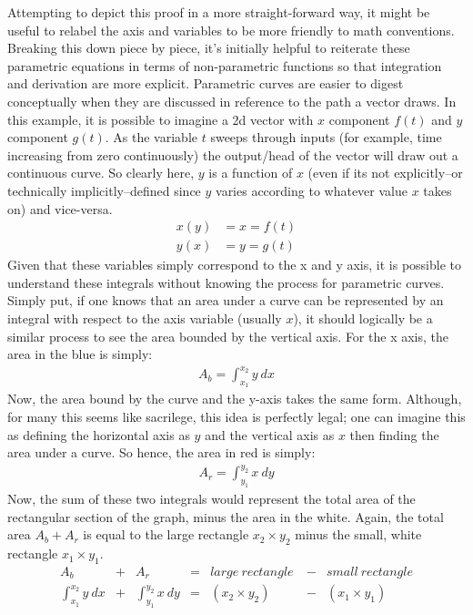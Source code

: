 \documentclass[11pt,a4paper]{article}
\begin{document}
Attempting to depict this proof in a more straight-forward way, it might be useful to relabel the axis and variables to be more friendly to math conventions. \\

Breaking this down piece by piece, it's initially helpful to reiterate these parametric equations in terms of non-parametric functions so that integration and derivation are more explicit. Parametric curves are easier to digest conceptually when they are discussed in reference to the path a vector draws. In this example, it is possible to imagine a 2d vector with $x$ component $f(t)$ and $y$ component $g(t)$.  As the variable $t$ sweeps through inputs (for example, time increasing from zero continuously) the output/head of the vector will draw out a continuous curve. So clearly here,  $y$ is a function of $x$ (even if its not explicitly--or technically implicitly--defined since $y$ varies according to whatever value $x$ takes on) and vice-versa.
\begin{align*}
x(y) &= x = f(t)\\
y(x) &= y = g(t)
\end{align*}
Given that these variables simply correspond to the x and y axis, it is possible to understand these integrals without knowing the process for parametric curves. Simply put, if one knows that an area under a curve can be represented by an integral with respect to the axis variable (usually $x$), it should logically be a similar process to see the area bounded by the vertical axis.  For the x axis, the area in the blue is simply:
\begin{align*}
A_b = \int_{x_1}^{x_2} y\ dx
\end{align*}
Now, the area bound by the curve and the y-axis takes the same form.  Although, for many this seems like sacrilege, this idea is perfectly legal; one can imagine this as defining the horizontal axis as $y$ and the vertical axis as $x$ then finding the area under a curve.  So hence, the area in red is simply:
\begin{align*}
A_r = \int_{y_1}^{y_2} x \ dy
\end{align*}
Now, the sum of these two integrals would represent the total area of the rectangular section of the graph,  minus the area in the white. Again,  the total area $A_b + A_r$ is equal to the large rectangle $x_2 \times y_2$ minus the small, white rectangle $x_1 \times y_1$.
\begin{align*}
A_b &+ &A_r &= &large\ rectangle\ &- &small\ rectangle \\
\int_{x_1}^{x_2} y \ dx &+ &\int_{y_1}^{y_2} x \ dy &= &( x_2 \times y_2)\ \ & - &(x_1 \times y_1)
\end{align*}
\end{document}

